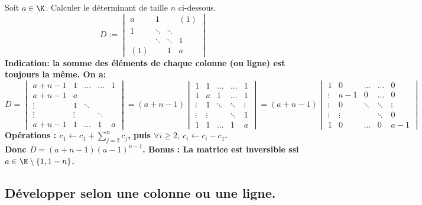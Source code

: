 \documentclass[11pt]{article}
\begin{document}
\begin{ex}{}{}
    Soit $a\in\K$. Calculer le déterminant de taille $n$ ci-dessous.
    \begin{equation*}
        D:=\begin{vmatrix}
            a&1&&(1)\\
            1&\ddots&\ddots&\\
            &\ddots&\ddots&1\\
            (1)&&1&a
        \end{vmatrix}
    \end{equation*}
    \bf{Indication:} la somme des éléments de chaque colonne (ou ligne) est toujours la même.
    \tcblower
    On a:
    \begin{equation*}
        D=\begin{vmatrix}
            a+n-1&1&...&...&1\\
            a+n-1&a&&&\\
            \vdots&1&\ddots&&\\
            \vdots&\vdots&&\ddots&\\
            a+n-1&1&...&1&a
        \end{vmatrix}
        =(a+n-1)\begin{vmatrix}
            1&1&...&...&1\\
            1&a&1&...&1\\
            \vdots&1&\ddots&\ddots&\vdots\\
            \vdots&\vdots&&\ddots&1\\
            1&1&...&1&a
        \end{vmatrix}
        =(a+n-1)\begin{vmatrix}
            1&0&...&...&0\\
            \vdots&a-1&0&...&0\\
            \vdots&0&\ddots&\ddots&\vdots\\
            \vdots&\vdots&&\ddots&0\\
            1&0&...&0&a-1
        \end{vmatrix}
    \end{equation*}
    Opérations : $c_1\gets c_1+\sum_{j=2}^nc_j$, puis $\forall i\geq2, ~ c_i \gets c_i - c_1$.\\
    Donc $D=(a+n-1)(a-1)^{n-1}$.\n
    Bonus : La matrice est inversible ssi $a\in\K\setminus\{1,1-n\}$.
\end{ex}

\subsection{Développer selon une colonne ou une ligne.}
\end{document}
